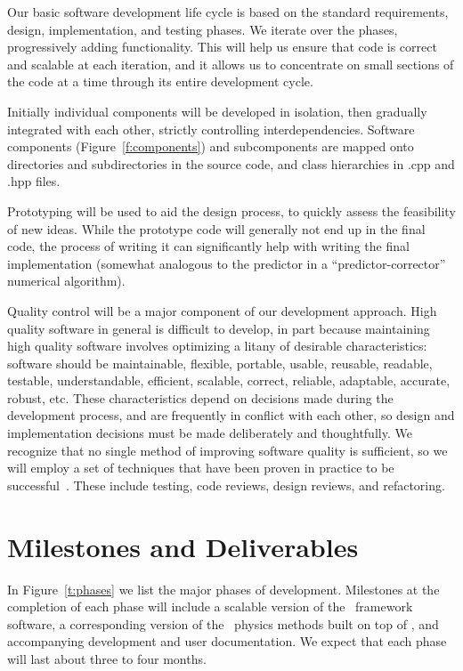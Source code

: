 \documentclass[10pt,twocolumn]{article}
\begin{document}
Our basic software development life cycle is based on the standard
requirements, design, implementation, and testing phases.  We iterate
over the phases, progressively adding functionality.  This will help
us ensure that code is correct and scalable at each iteration, and it
allows us to concentrate on small sections of the code at a time
through its entire development cycle.  

Initially individual components will be developed in isolation, then
gradually integrated with each other, strictly controlling
interdependencies.  Software components (Figure~\ref{f:components})
and subcomponents are mapped onto directories and subdirectories in
the source code, and class hierarchies in .cpp and .hpp files.

Prototyping will be used to aid the design process, to quickly assess
the feasibility of new ideas.  While the prototype code will generally
not end up in the final code, the process of writing it can
significantly help with writing the final implementation (somewhat
analogous to the predictor in a ``predictor-corrector'' numerical
algorithm).

Quality control will be a major component of our development approach.
High quality software in general is difficult to develop, in part
because maintaining high quality software involves optimizing a litany
of desirable characteristics: software should be maintainable,
flexible, portable, usable, reusable, readable, testable,
understandable, efficient, scalable, correct, reliable, adaptable,
accurate, robust, etc.  These characteristics depend on decisions made
during the development process, and are frequently in conflict with
each other, so design and implementation decisions must be made
deliberately and thoughtfully.  We recognize that no single method of
improving software quality is sufficient, so we will employ a set of
techniques that have been proven in practice to be
successful~\cite{Mc04}.  These include testing, code reviews, design
reviews, and refactoring.



\section{Milestones and Deliverables} \label{s:milestones}

In Figure~\ref{t:phases} we list the major phases of development.
Milestones at the completion of each phase will include a scalable
version of the \cello\ framework software, a corresponding version of
the \enzoii\ physics methods built on top of \cello, and accompanying
development and user documentation.  We expect that each phase will
last about three to four months.
\end{document}
